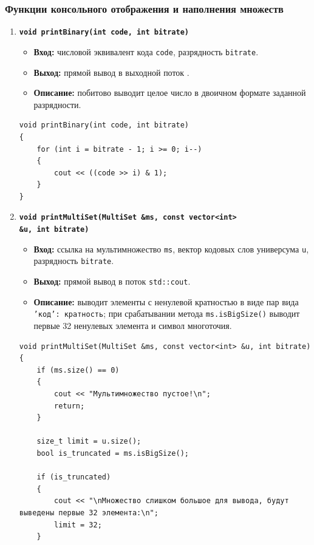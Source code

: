 \documentclass[14pt, a4paper]{extarticle}
\begin{document}
	\subsubsection*{Функции консольного отображения и наполнения множеств}
	\begin{enumerate}[label=\arabic*., resume]
		\item \textbf{\texttt{void printBinary(int code, int bitrate)}}
		\begin{itemize}[leftmargin=*, noitemsep]
			\item \textbf{Вход:} числовой эквивалент кода \texttt{code}, разрядность \texttt{bitrate}.
			\item \textbf{Выход:} прямой вывод в выходной поток .
			\item \textbf{Описание:} побитово выводит целое число в двоичном формате заданной разрядности.
		\end{itemize}
		\begin{lstlisting}[caption={Функция printBinary()}, label={lst:func_print_binary}]
void printBinary(int code, int bitrate)
{
    for (int i = bitrate - 1; i >= 0; i--)
    {
        cout << ((code >> i) & 1);
    }
}
		\end{lstlisting}
		
		\item \textbf{\texttt{void printMultiSet(MultiSet \&ms, const vector<int> \\ \&u, int bitrate)}}
		\begin{itemize}[leftmargin=*, noitemsep]
			\item \textbf{Вход:} ссылка на мультимножество \texttt{ms}, вектор кодовых слов универсума \texttt{u}, разрядность \texttt{bitrate}.
			\item \textbf{Выход:} прямой вывод в поток \texttt{std::cout}.
			\item \textbf{Описание:} выводит элементы с ненулевой кратностью в виде пар вида \texttt{'код': кратность}; при срабатывании метода \texttt{ms.isBigSize()} выводит первые 32 ненулевых элемента и символ многоточия.
		\end{itemize}
		\begin{lstlisting}[caption={Функция printMultiSet()}, label={lst:func_print_multiset}]
void printMultiSet(MultiSet &ms, const vector<int> &u, int bitrate)
{
    if (ms.size() == 0)
    {
        cout << "Мультимножество пустое!\n";
        return;
    }

    size_t limit = u.size();
    bool is_truncated = ms.isBigSize();

    if (is_truncated)
    {
        cout << "\nМножество слишком большое для вывода, будут выведены первые 32 элемента:\n";
        limit = 32;
    }


\end{lstlisting}
\end{enumerate}
\end{document}
